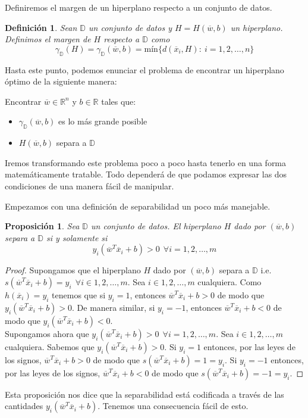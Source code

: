 \documentclass[11pt]{article}
\newtheorem{definition}{Definición}[section]
\newtheorem{proposition}{Proposición}[section]
\newcommand{\R}{\mathbb{R}}
\newcommand{\Rn}{\R^{n}}
\newcommand{\wv}{\overline{w}}
\newcommand{\x}{\overline{x}}
\newcommand{\Sn}{1,2,\ldots, n}
\newcommand{\Sm}{1,2,\ldots, m}
\newcommand{\Dat}{\mathbb{D}}
\begin{document}
Definiremos el margen de un hiperplano respecto a un conjunto de datos.
\begin{definition}
Sean $\Dat$ un conjunto de datos y $H=H(\wv, b)$ un hiperplano. Definimos el margen de $H$ respecto a $\Dat$ como
$$\gamma_{\Dat}(H)=\gamma_{\Dat}(\wv, b)=\text{mín}\{d(\x_{i}, H):\ i=\Sn\}$$
\end{definition}
Hasta este punto, podemos enunciar el problema de encontrar un hiperplano óptimo de la siguiente manera:
\begin{center}
Encontrar $\wv\in\Rn$ y $b\in\R$ tales que:\\
\begin{itemize}
\item $\gamma_{\Dat}(\wv, b)$ es lo más grande posible
\item $H(\wv, b)$ separa a $\Dat$\\
\end{itemize}
\end{center}

Iremos transformando este problema poco a poco hasta tenerlo en una forma matemáticamente tratable. Todo dependerá de que podamos expresar las dos condiciones de una manera fácil de manipular.

Empezamos con una definición de separabilidad un poco más manejable.
\begin{proposition}
Sea $\Dat$ un conjunto de datos. El hiperplano $H$ dado por $(\wv, b)$ separa a $\Dat$ si y solamente si
$$y_{i}(\wv ^{T}\x_{i}+b)>0\ \ \forall i=\Sm$$
\end{proposition}
\begin{proof}
Supongamos que el hiperplano $H$ dado por $(\wv, b)$ separa a $\Dat$ i.e. $s(\wv^{T}\x_{i}+b)=y_i\ \ \forall i\in\Sm$. Sea $i\in{1,2,\ldots,m}$ cualquiera. Como $h(\x_{i})= y_{i}$ tenemos que si $y_{i}=1$, entonces $\wv^{T}\x_{i}+b>0$ de modo que $y_{i}(\wv^{T}\x_{i}+b)>0$. De manera similar, si $y_{i}=-1$, entonces $\wv^{T}\x_{i}+b<0$ de modo que $y_{i}(\wv^{T}\x_{i}+b)<0$.\\
Supongamos ahora que $y_{i}(\wv ^{T}\x_{i}+b)>0\ \ \forall i=\Sm$. Sea $i\in{1,2,\ldots,m}$ cualquiera. Sabemos que $y_{i}(\wv ^{T}\x_{i}+b)>0$. Si $y_{i}=1$ entonces, por las leyes de los signos, $\wv ^{T}\x_{i}+b>0$ de modo que $s(\wv ^{T}\x_{i}+b)=1=y_{i}$. Si $y_{i}=-1$ entonces, por las leyes de los signos, $\wv ^{T}\x_{i}+b<0$ de modo que $s(\wv ^{T}\x_{i}+b)=-1=y_{i}$.
\end{proof}

Esta proposición nos dice que la separabilidad está codificada a través de las cantidades $y_{i}(\wv ^{T}\x_{i}+b)$. Tenemos una consecuencia fácil de esto.
\end{document}
